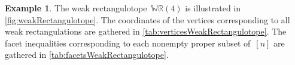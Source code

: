 \documentclass{amsart}
\theoremstyle{definition}
\newtheorem{example}[theorem]{Example}
\newcommand{\polytope}[1]{\mathds{#1}} %
\newcommand{\WRP}{\polytope{WR}} %
\begin{document}
\begin{example}
The weak rectangulotope~$\WRP(4)$ is illustrated in \cref{fig:weakRectangulotope}.
The coordinates of the vertices corresponding to all weak rectangulations are gathered in \cref{tab:verticesWeakRectangulotope}.
The facet inequalities corresponding to each nonempty proper subset of~$[n]$ are gathered in \cref{tab:facetsWeakRectangulotope}.



\end{example}
\end{document}
